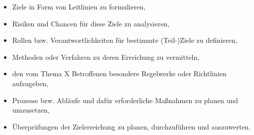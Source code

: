 \begin{itemize}
	\item Ziele in Form von Leitlinien zu formulieren,
	\item Risiken und Chancen für diese Ziele zu analysieren,
	\item Rollen bzw. Verantwortlichkeiten für bestimmte (Teil-)Ziele zu definieren,
	\item Methoden oder Verfahren zu deren Erreichung zu vermitteln,
	\item den vom Thema X Betroffenen besondere Regelwerke oder Richtlinien aufzugeben,
	\item Prozesse bzw. Abläufe und dafür erforderliche Maßnahmen zu planen und umzusetzen,
	\item Überprüfungen der Zielerreichung zu planen, durchzuführen und auszuwerten.
\end{itemize}
